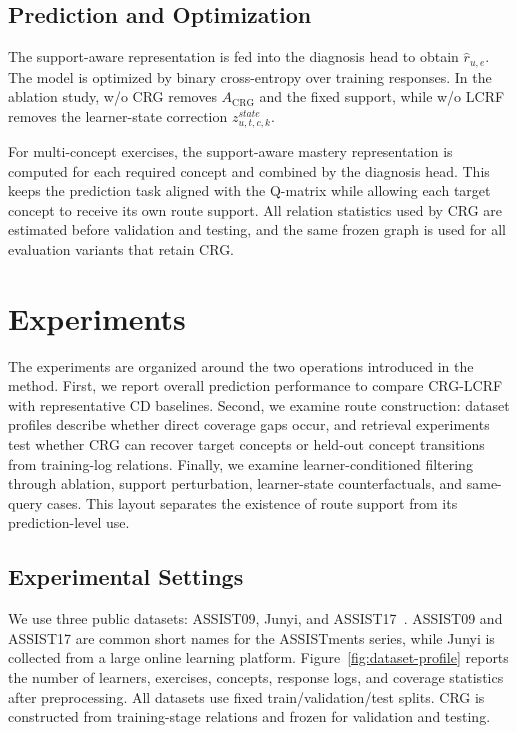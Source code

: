 \documentclass[conference]{IEEEtran}
\begin{document}
\subsection{Prediction and Optimization}
The support-aware representation is fed into the diagnosis head to obtain \(\hat r_{u,e}\). The model is optimized by binary cross-entropy over training responses. In the ablation study, w/o CRG removes \(A_{\mathrm{CRG}}\) and the fixed support, while w/o LCRF removes the learner-state correction \(z^{state}_{u,t,c,k}\).

For multi-concept exercises, the support-aware mastery representation is computed for each required concept and combined by the diagnosis head. This keeps the prediction task aligned with the Q-matrix while allowing each target concept to receive its own route support. All relation statistics used by CRG are estimated before validation and testing, and the same frozen graph is used for all evaluation variants that retain CRG.

\section{Experiments}
The experiments are organized around the two operations introduced in the method. First, we report overall prediction performance to compare CRG-LCRF with representative CD baselines. Second, we examine route construction: dataset profiles describe whether direct coverage gaps occur, and retrieval experiments test whether CRG can recover target concepts or held-out concept transitions from training-log relations. Finally, we examine learner-conditioned filtering through ablation, support perturbation, learner-state counterfactuals, and same-query cases. This layout separates the existence of route support from its prediction-level use.

\subsection{Experimental Settings}
We use three public datasets: ASSIST09, Junyi, and ASSIST17~\cite{assistments2009,heffernan2017assistments,assistments2017,choi2020ednet}. ASSIST09 and ASSIST17 are common short names for the ASSISTments series, while Junyi is collected from a large online learning platform. Figure~\ref{fig:dataset-profile} reports the number of learners, exercises, concepts, response logs, and coverage statistics after preprocessing. All datasets use fixed train/validation/test splits. CRG is constructed from training-stage relations and frozen for validation and testing.
\end{document}
